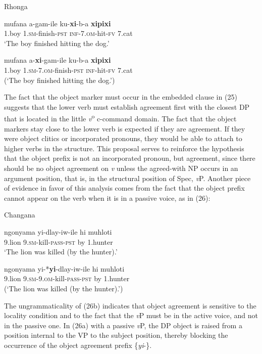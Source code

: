 \documentclass[output=paper]{langsci/langscibook}
\begin{document}
{Rhonga}

\ea
\gll mufana         a-gam-ile                ku-\textbf{xi}{}-b-a                   \textbf{xipixi}\\
     1.boy           1.\textsc{sm}{}-finish-\textsc{pst}        \textsc{inf}{}-7.\textsc{om}{}-hit-\textsc{fv}        7.cat\\
\glt ‘The boy finished hitting the dog.’
\z

\ea
\gll *mufana       a-\textbf{xi}{}-gam-ile                      ku-b-a            \textbf{xipixi}\\
     1.boy           \textsc{1.sm-7.om}{}-finish-\textsc{pst}         \textsc{inf}{}-hit-\textsc{fv}      7.cat\\
\glt (‘The boy finished hitting the dog.’)
\z

The fact that the object marker must occur in the embedded clause in (25) suggests that the lower verb must establish agreement first with the closest DP that is located in the little {\textit{v}}{\textsuperscript{o}} c-command domain. The fact that the object markers stay close to the lower verb is expected if they are agreement. If they were object clitics or incorporated pronouns, they would be able to attach to higher verbs in the structure. This proposal serves to reinforce the hypothesis that the object prefix is not an incorporated pronoun, but agreement, since there should be no object agreement on {\textit{v}} unless the agreed-with NP occurs in an argument position, that is, in the structural position of  Spec, {\textit{v}}P. Another piece of evidence in favor of this analysis comes from the fact that the object prefix cannot appear on the verb when it is in a passive voice, as in (26):

{Changana}

\ea
\gll ngonyama            yi-dlay-iw-ile               hi      muhloti\\
     9.lion                   9.\textsc{sm}{}-kill-\textsc{pass}{}-\textsc{pst}       by     1.hunter\\
\glt ‘The lion was killed (by the hunter).’
\z

\ea
\gll *ngonyama          yi-*\textbf{yi}{}-dlay-iw-ile                  hi       muhloti\\
     9.lion                   9.\textsc{sm-9.om}{}-kill-\textsc{pass-pst}       by      1.hunter\\
\glt (‘The lion was killed (by the hunter).’)
\z

The ungrammaticality of (26b) indicates that object agreement is sensitive to the locality condition and to the fact that the {\textit{v}}P must be in the active voice, and not in the passive one. In (26a) with a passive {\textit{v}}P, the DP object is raised from a position internal to the VP to the subject position, thereby blocking the occurrence of the object agreement prefix \{{\textit{yi}}{}-\}.
\end{document}
